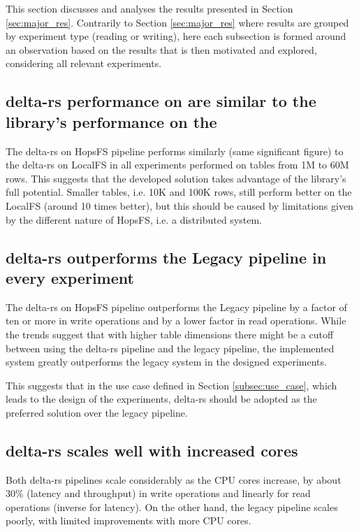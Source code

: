 This section discusses and analyses the results presented in Section \ref{sec:major_res}. Contrarily to Section \ref{sec:major_res} where results are grouped by experiment type (reading or writing), here each subsection is formed around an observation based on the results that is then motivated and explored, considering all relevant experiments.

\subsection{delta-rs performance on  are similar to the library's performance on the }

The delta-rs on \gls{HopsFS} pipeline performs similarly (same significant figure) to the delta-rs on \gls{LocalFS} in all experiments performed on tables from 1M to 60M rows. This suggests that the developed solution takes advantage of the library's full potential. Smaller tables, i.e. 10K and 100K rows, still perform better on the \gls{LocalFS} (around 10 times better), but this should be caused by limitations given by the different nature of \gls{HopsFS}, i.e. a distributed system.

\subsection{delta-rs outperforms the Legacy pipeline in every experiment}

The delta-rs on \gls{HopsFS} pipeline outperforms the Legacy pipeline by a factor of ten or more in write operations and by a lower factor in read operations. While the trends suggest that with higher table dimensions there might be a cutoff between using the delta-rs pipeline and the legacy pipeline, the implemented system greatly outperforms the legacy system in the designed experiments. 

This suggests that in the use case defined in Section \ref{subsec:use_case}, which leads to the design of the experiments, delta-rs should be adopted as the preferred solution over the legacy pipeline.

\subsection{delta-rs scales well with increased  cores}

Both delta-rs pipelines scale considerably as the \gls{CPU} cores increase, by about 30\% (latency and throughput) in write operations and linearly for read operations (inverse for latency). On the other hand, the legacy pipeline scales poorly, with limited improvements with more \gls{CPU} cores. 

